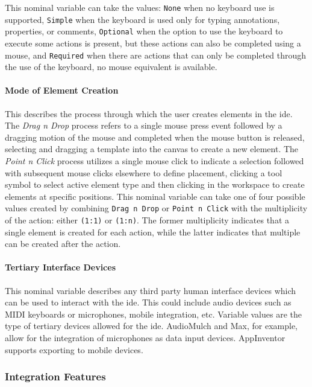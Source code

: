 This nominal variable can take the values:
\texttt{None} when no keyboard use is supported,
\texttt{Simple} when the keyboard is used only for typing annotations, properties, or comments,
\texttt{Optional} when the option to use the keyboard to execute some actions is present, but these actions can also be completed using a mouse,
and \texttt{Required} when there are actions that can only be completed through the use of the keyboard, no mouse equivalent is available.


\paragraph{Mode of Element Creation}
This describes the process through which the user creates elements in the
\ac{ide}. The \emph{Drag n Drop} process refers to a single mouse press
event followed by a dragging motion of the mouse and completed when the
mouse button is released, \eg selecting and dragging a template into the
canvas to create a new element. The \emph{Point n Click} process utilizes
a single mouse click to indicate a selection followed with subsequent mouse
clicks elsewhere to define placement, \eg clicking a tool symbol to select
active element type and then clicking in the workspace to create elements
at specific positions. This nominal variable can take one of four possible
values created by combining \texttt{Drag n Drop} or \texttt{Point n Click}
with the multiplicity of the action: either \texttt{(1:1)} or
\texttt{(1:n)}. The former multiplicity indicates that a single element is
created for each action, while the latter indicates that multiple can be
created after the action.


\paragraph{Tertiary Interface Devices}
This nominal variable describes any
third party human interface devices which can be used to interact with the
\ac{ide}. This could include audio devices such as MIDI keyboards or
microphones, mobile integration, etc. Variable values are the type of
tertiary devices allowed for the \ac{ide}. AudioMulch and Max, for example,
allow for the integration of microphones as data input devices. AppInventor
supports exporting to mobile devices.


\subsubsection{Integration Features} \label{subsubsec:integration}

